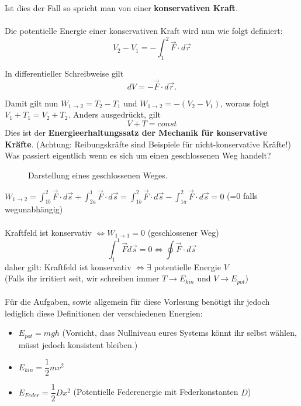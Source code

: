 \documentclass[12pt]{article}
\begin{document}
Ist dies der Fall so spricht man von einer \textbf{konservativen Kraft}.
\\
\\
Die potentielle Energie einer konservativen Kraft wird nun wie folgt definiert:
\begin{equation}
V_2 - V_1 = -\int_{1}^2 \vec{F}\cdot d\vec{r}
\end{equation}

In differentieller Schreibweise gilt
\begin{equation}
dV = -\vec{F} \cdot d\vec{r}.
\end{equation}

Damit gilt nun $W_{1 \rightarrow 2} = T_2-T_1$ und $W_{1 \rightarrow 2} = -(V_2-V_1)$, woraus folgt $V_1+T_1 = V_2+T_2$. Anders ausgedrückt, gilt
\begin{equation}
V+T = const
\end{equation}
Dies ist der \textbf{Energieerhaltungssatz der Mechanik für konservative Kräfte}. (Achtung: Reibungskräfte sind Beispiele für nicht-konservative Kräfte!)
\newpage
Was passiert eigentlich wenn es sich um einen geschlossenen Weg handelt?
\begin{figure}[H]
  \caption{Darstellung eines geschlossenen Weges.}
  \label{fig:1teil}
\end{figure}
$W_{1 \rightarrow 2} = \int_{1b}^2 \vec{F} \cdot d\vec{s} + \int_{2a}^1 \vec{F} \cdot d\vec{s} = \int_{1b}^2 \vec{F} \cdot d\vec{s} - \int_{1a}^2 \vec{F} \cdot d\vec{s} = 0$ (=0 falls wegunabhängig)\\
\\ Kraftfeld ist konservativ $\Leftrightarrow W_{1 \rightarrow 1} = 0$ (geschlossener Weg)
\begin{equation}
\int_1^1 \vec{F} d\vec{s} = 0 \Leftrightarrow \oint \vec{F} \cdot d\vec{s}
\end{equation}
daher gilt: Kraftfeld ist konservativ $\Leftrightarrow \exists$ potentielle Energie $V$\\
(Falls ihr irritiert seit, wir schreiben immer $T \rightarrow E_{kin}$ und $V \rightarrow E_{pot}$)\\
\\
Für die Aufgaben, sowie allgemein für diese Vorlesung benötigt ihr jedoch lediglich diese Definitionen der verschiedenen Energien:
\begin{itemize}
\item $E_{pot} = mgh$ (Vorsicht, dass Nullniveau eures Systems könnt ihr selbst wählen, müsst jedoch konsistent bleiben.)

\item $E_{kin} = \dfrac{1}{2}mv^2$

\item $E_{Feder} = \dfrac{1}{2}Dx^2$ (Potentielle Federenergie mit Federkonstanten $D$)
\end{itemize}
\end{document}
